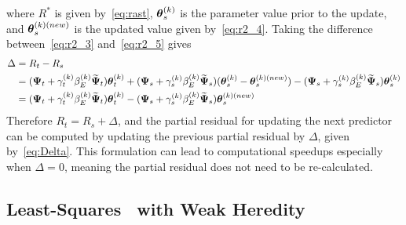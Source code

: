 where $R^\ast$ is given by~\eqref{eq:rast}, $\boldsymbol{\theta}_s^{(k)}$ is the parameter value prior to the update, and $\boldsymbol{\theta}_s^{(k)(new)}$ is the updated value given by~\eqref{eq:r2_4}. Taking the difference between~\eqref{eq:r2_3} and~\eqref{eq:r2_5} gives
\begin{align}
\Delta & = R_t - R_s \nonumber\\
& = (\boldsymbol{\Psi}_t + \gamma_t^{(k)}\beta_E^{(k)} \widetilde{\boldsymbol{\Psi}}_t)\boldsymbol{\theta}_t^{(k)} + (\boldsymbol{\Psi}_s + \gamma_s^{(k)}\beta_E^{(k)} \widetilde{\boldsymbol{\Psi}}_s)(\boldsymbol{\theta}_s^{(k)} - \boldsymbol{\theta}_s^{(k)(new)}) - (\boldsymbol{\Psi}_s + \gamma_s^{(k)}\beta_E^{(k)} \widetilde{\boldsymbol{\Psi}}_s)\boldsymbol{\theta}_s^{(k)} \nonumber\\
& = (\boldsymbol{\Psi}_t + \gamma_t^{(k)}\beta_E^{(k)} \widetilde{\boldsymbol{\Psi}}_t)\boldsymbol{\theta}_t^{(k)} - (\boldsymbol{\Psi}_s + \gamma_s^{(k)}\beta_E^{(k)} \widetilde{\boldsymbol{\Psi}}_s)\boldsymbol{\theta}_s^{(k)(new)} \label{eq:Delta}
\end{align} 
Therefore $R_t = R_s + \Delta$, and the partial residual for updating the next predictor can be computed by updating the previous partial residual by $\Delta$, given by~\eqref{eq:Delta}. This formulation can lead to computational speedups especially when $\Delta = 0$, meaning the partial residual does not need to be re-calculated.  



\subsection{Least-Squares \sail ~with Weak Heredity} \label{ap:subsec:lssailweak}

